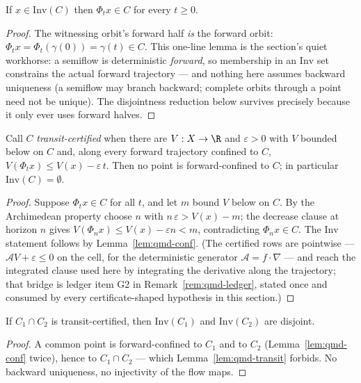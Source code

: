 \begin{blemma}\label{lem:qmd-conf}
If $x \in \mathrm{Inv}(C)$ then $\Phi_t x \in C$ for every
$t \geq 0$.
\end{blemma}
\begin{proof}
The witnessing orbit's forward half \emph{is} the forward orbit:
$\Phi_t x = \Phi_t(\gamma(0)) = \gamma(t) \in C$. This one-line lemma
is the section's quiet workhorse: a semiflow is deterministic
\emph{forward}, so membership in an $\mathrm{Inv}$ set constrains the
actual forward trajectory --- and nothing here assumes backward
uniqueness (a semiflow may branch backward; complete orbits through a
point need not be unique). The disjointness reduction below survives
precisely because it only ever uses forward halves.
\end{proof}

\begin{blemma}\label{lem:qmd-transit}
Call $C$ \emph{transit-certified} when there are $V : X \to \R$ and
$\varepsilon > 0$ with $V$ bounded below on $C$ and, along every
forward trajectory confined to $C$,
$V(\Phi_t x) \leq V(x) - \varepsilon\, t$. Then no point is
forward-confined to $C$; in particular
$\mathrm{Inv}(C) = \emptyset$.
\end{blemma}
\begin{proof}
Suppose $\Phi_t x \in C$ for all $t$, and let $m$ bound $V$ below on
$C$. By the Archimedean property choose $n$ with
$n\,\varepsilon > V(x) - m$; the decrease clause at horizon $n$ gives
$V(\Phi_n x) \leq V(x) - \varepsilon n < m$, contradicting
$\Phi_n x \in C$. The $\mathrm{Inv}$ statement follows by
Lemma~\ref{lem:qmd-conf}. (The certified rows are pointwise ---
$\mathcal{A}V + \varepsilon \leq 0$ on the cell, for the deterministic
generator $\mathcal{A} = f \cdot \nabla$ --- and reach the integrated
clause used here by integrating the derivative along the trajectory;
that bridge is ledger item G2 in Remark~\ref{rem:qmd-ledger}, stated
once and consumed by every certificate-shaped hypothesis in this
section.)
\end{proof}

\begin{blemma}
\label{lem:qmd-disj}
If $C_1 \cap C_2$ is transit-certified, then
$\mathrm{Inv}(C_1)$ and $\mathrm{Inv}(C_2)$ are disjoint.
\end{blemma}
\begin{proof}
A common point is forward-confined to $C_1$ and to $C_2$
(Lemma~\ref{lem:qmd-conf} twice), hence to $C_1 \cap C_2$ --- which
Lemma~\ref{lem:qmd-transit} forbids. No backward uniqueness, no
injectivity of the flow maps.
\end{proof}

